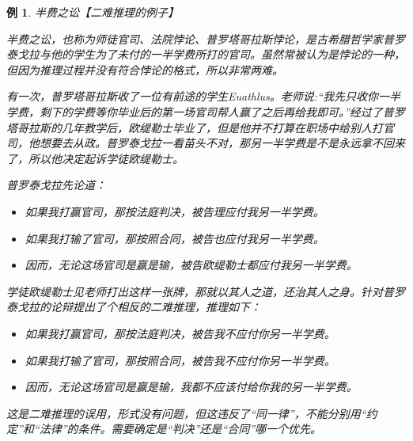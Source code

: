 \documentclass[12pt,onecolumn,a4paper]{book}
\newtheorem*{example}{例}
\numberwithin{table}{subsection}
\numberwithin{equation}{subsection}
\begin{document}
\begin{example}
    半费之讼【二难推理的例子】

    半费之讼，也称为师徒官司、法院悖论、普罗塔哥拉斯悖论，是古希腊哲学家普罗泰戈拉与他的学生为了未付的一半学费所打的官司。虽然常被认为是悖论的一种，但因为推理过程并没有符合悖论的格式，所以非常两难。

    有一次，普罗塔哥拉斯收了一位有前途的学生Euathlus。老师说:“我先只收你一半学费，剩下的学费等你毕业后的第一场官司帮人赢了之后再给我即可。”经过了普罗塔哥拉斯的几年教学后，欧缇勒士毕业了，但是他并不打算在职场中给别人打官司，他想要去从政。普罗泰戈拉一看苗头不对，那另一半学费是不是永远拿不回来了，所以他决定起诉学徒欧缇勒士。

    普罗泰戈拉先论道：
    \begin{itemize}[itemsep=0pt,parsep=0pt]
        \item 如果我打赢官司，那按法庭判决，被告理应付我另一半学费。
        \item 如果我打输了官司，那按照合同，被告也应付我另一半学费。
        \item 因而，无论这场官司是赢是输，被告欧缇勒士都应付我另一半学费。
    \end{itemize}

    学徒欧缇勒士见老师打出这样一张牌，那就以其人之道，还治其人之身。针对普罗泰戈拉的论辩提出了个相反的二难推理，推理如下：
    \begin{itemize}[itemsep=0pt,parsep=0pt]
        \item 如果我打赢官司，那按法庭判决，被告我不应付你另一半学费。
        \item 如果我打输了官司，那按照合同，被告我不应付你另一半学费。
        \item 因而，无论这场官司是赢是输，我都不应该付给你我的另一半学费。
    \end{itemize}

    这是二难推理的误用，形式没有问题，但这违反了“同一律”，不能分别用“约定”和“法律”的条件。需要确定是“判决”还是“合同”哪一个优先。
\end{example}
\end{document}
